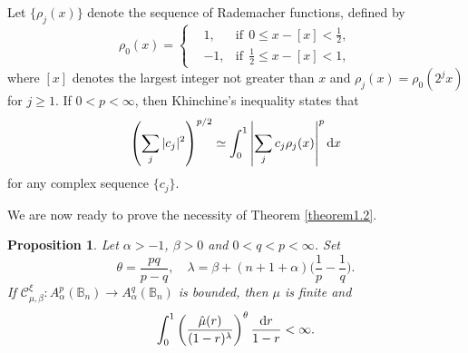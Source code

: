 \documentclass[preprint,12pt,times]{elsarticle}
\newtheorem{proposition}[theorem]{Proposition}
\theoremstyle{definition}
\theoremstyle{remark}
\numberwithin{equation}{section}
\begin{document}
Let $\{\rho_j(x)\}$ denote the sequence of Rademacher functions, defined by 
\begin{equation*}
\rho_0(x)=\left\{
\begin{aligned}
&1, &\text{if}~~ 0\leq x-[x]<\frac{1}{2},\\
&-1, &\text{if}~~ \frac{1}{2}\leq x-[x]<1,
\end{aligned}
\right.
\end{equation*}
where $[x]$ denotes the largest integer not greater than $x$ and $\rho_{j}(x)=\rho_0(2^jx)$ for $j\geq 1$. If $0<p<\infty$, then Khinchine's inequality states that
\begin{equation*}
\left(\sum_{j}|c_j|^2\right)^{p/2}\simeq \int_{0}^1\left|\sum_{j}c_j\rho_j(x)\right|^p{\rm d}x
\end{equation*}
for any complex sequence $\{c_j\}$.

We are now ready to prove the necessity of Theorem \ref{theorem1.2}.

\begin{proposition}\label{proposition4.7}
Let $\alpha>-1$, $\beta>0$ and  \;  $0<q<p<\infty$. Set
\[
    \theta=\frac{pq}{p-q},\quad \lambda=\beta+(n+1+\alpha)\Big(\frac{1}{p}-\frac{1}{q}\Big).
\]
If $\mathcal{C}_{\mu,\beta}^{\xi}: A_{\alpha}^p(\mathbb{B}_n)\to A_{\alpha}^q(\mathbb{B}_n)$ is bounded, then $\mu$ is finite and 
\[
    \int_{0}^1\left(\frac{\hat{\mu}(r)}{(1-r)^{\lambda}}\right)^{\theta}\frac{{\rm d}r}{1-r}<\infty.
\]
\end{proposition}
\end{document}
